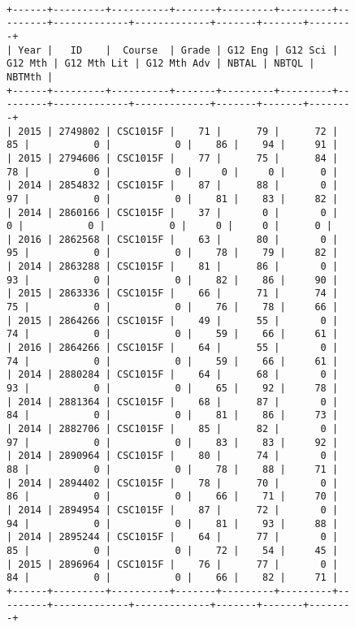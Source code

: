 \begin{figure}[H]
    \centering
    \begin{mdframed}[rightline=false,leftline=false]
        \centering
        \begin{BVerbatim}[fontsize=\tiny]

+------+---------+----------+-------+---------+---------+---------+-------------+-------------+-------+-------+--------+
| Year |   ID    |  Course  | Grade | G12 Eng | G12 Sci | G12 Mth | G12 Mth Lit | G12 Mth Adv | NBTAL | NBTQL | NBTMth |
+------+---------+----------+-------+---------+---------+---------+-------------+-------------+-------+-------+--------+
| 2015 | 2749802 | CSC1015F |    71 |      79 |      72 |      85 |           0 |           0 |    86 |    94 |     91 |
| 2015 | 2794606 | CSC1015F |    77 |      75 |      84 |      78 |           0 |           0 |     0 |     0 |      0 |
| 2014 | 2854832 | CSC1015F |    87 |      88 |       0 |      97 |           0 |           0 |    81 |    83 |     82 |
| 2014 | 2860166 | CSC1015F |    37 |       0 |       0 |       0 |           0 |           0 |     0 |     0 |      0 |
| 2016 | 2862568 | CSC1015F |    63 |      80 |       0 |      95 |           0 |           0 |    78 |    79 |     82 |
| 2014 | 2863288 | CSC1015F |    81 |      86 |       0 |      93 |           0 |           0 |    82 |    86 |     90 |
| 2015 | 2863336 | CSC1015F |    66 |      71 |      74 |      75 |           0 |           0 |    76 |    78 |     66 |
| 2015 | 2864266 | CSC1015F |    49 |      55 |       0 |      74 |           0 |           0 |    59 |    66 |     61 |
| 2016 | 2864266 | CSC1015F |    64 |      55 |       0 |      74 |           0 |           0 |    59 |    66 |     61 |
| 2014 | 2880284 | CSC1015F |    64 |      68 |       0 |      93 |           0 |           0 |    65 |    92 |     78 |
| 2014 | 2881364 | CSC1015F |    68 |      87 |       0 |      84 |           0 |           0 |    81 |    86 |     73 |
| 2014 | 2882706 | CSC1015F |    85 |      82 |       0 |      97 |           0 |           0 |    83 |    83 |     92 |
| 2014 | 2890964 | CSC1015F |    80 |      74 |       0 |      88 |           0 |           0 |    78 |    88 |     71 |
| 2014 | 2894402 | CSC1015F |    78 |      70 |       0 |      86 |           0 |           0 |    66 |    71 |     70 |
| 2014 | 2894954 | CSC1015F |    87 |      72 |       0 |      94 |           0 |           0 |    81 |    93 |     88 |
| 2014 | 2895244 | CSC1015F |    64 |      77 |       0 |      85 |           0 |           0 |    72 |    54 |     45 |
| 2015 | 2896964 | CSC1015F |    76 |      77 |       0 |      84 |           0 |           0 |    66 |    82 |     71 |
+------+---------+----------+-------+---------+---------+---------+-------------+-------------+-------+-------+--------+


\end{BVerbatim}
\end{mdframed}
\end{figure}
